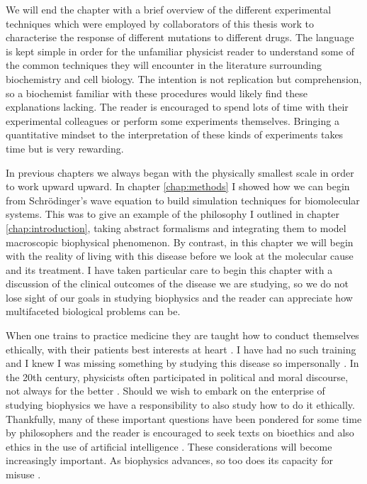 We will end the chapter with a brief overview of the different experimental techniques which were employed by collaborators of this thesis work to characterise the response of different mutations to different drugs. The language is kept simple in order for the unfamiliar physicist reader to understand some of the common techniques they will encounter in the literature surrounding biochemistry and cell biology. The intention is not replication but comprehension, so a biochemist familiar with these procedures would likely find these explanations lacking. The reader is encouraged to spend lots of time with their experimental colleagues or perform some experiments themselves. Bringing a quantitative mindset to the interpretation of these kinds of experiments takes time but is very rewarding.

In previous chapters we always began with the physically smallest scale in order to work upward upward. In chapter \ref{chap:methods} I showed how we can begin from Schr\"odinger's wave equation to build simulation techniques for biomolecular systems. This was to give an example of the philosophy I outlined in chapter \ref{chap:introduction}, taking abstract formalisms and integrating them to model macroscopic biophysical phenomenon. By contrast, in this chapter we will begin with the reality of living with this disease before we look at the molecular cause and its treatment. I have taken particular care to begin this chapter with a discussion of the clinical outcomes of the disease we are studying, so we do not lose sight of our goals in studying biophysics and the reader can appreciate how multifaceted biological problems can be. 

When one trains to practice medicine they are taught how to conduct themselves ethically, with their patients best interests at heart \cite{hajar2017}. I have had no such training and I knew I was missing something by studying this disease so impersonally \cite{foucault1994}. In the 20th century, physicists often participated in political and moral discourse, not always for the better \cite{frank1993, gottfried1999, global2009, rhodes1986, aaronson2008, berger2016, vonneumann_britanica}. Should we wish to embark on the enterprise of studying biophysics we have a responsibility to also study how to do it ethically. Thankfully, many of these important questions have been pondered for some time by philosophers and the reader is encouraged to seek texts on bioethics and also ethics in the use of artificial intelligence \cite{buchanan2000, taneri2011, genome_editting_guildelines_2017, muller2021, bostrom2014}. These considerations will become increasingly important. As biophysics advances, so too does its capacity for misuse \cite{mallapaty2022, urbina2022}. 

